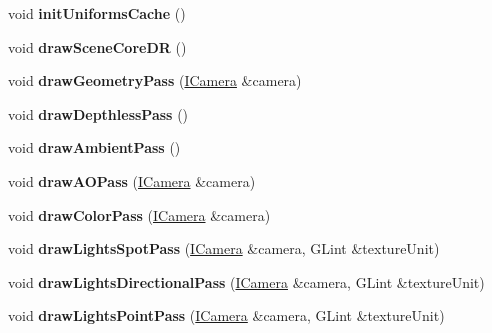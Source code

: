 \begin{DoxyCompactItemize}
void {\bfseries init\+Uniforms\+Cache} ()
\item 
\mbox{\label{classflw_1_1flf_1_1RendererDR_aef4f2d788450a34f1df7e037c418c840}} 
void {\bfseries draw\+Scene\+Core\+DR} ()
\item 
\mbox{\label{classflw_1_1flf_1_1RendererDR_ac64ac1f3331fe2a531bbe375e81d77a6}} 
void {\bfseries draw\+Geometry\+Pass} (\hyperlink{classflw_1_1flf_1_1ICamera}{I\+Camera} \&camera)
\item 
\mbox{\label{classflw_1_1flf_1_1RendererDR_a37a822463882acbbac59e9052b08a742}} 
void {\bfseries draw\+Depthless\+Pass} ()
\item 
\mbox{\label{classflw_1_1flf_1_1RendererDR_a46b49427c7d1a42c55e64b70e16d4d4d}} 
void {\bfseries draw\+Ambient\+Pass} ()
\item 
\mbox{\label{classflw_1_1flf_1_1RendererDR_a99d0d74fffca7965d9e264dd89fd0cf7}} 
void {\bfseries draw\+A\+O\+Pass} (\hyperlink{classflw_1_1flf_1_1ICamera}{I\+Camera} \&camera)
\item 
\mbox{\label{classflw_1_1flf_1_1RendererDR_a1c7fb1ab235284eeb1eb87457dc3efc5}} 
void {\bfseries draw\+Color\+Pass} (\hyperlink{classflw_1_1flf_1_1ICamera}{I\+Camera} \&camera)
\item 
\mbox{\label{classflw_1_1flf_1_1RendererDR_a1535e73ea46bb22716ea72a25665a89b}} 
void {\bfseries draw\+Lights\+Spot\+Pass} (\hyperlink{classflw_1_1flf_1_1ICamera}{I\+Camera} \&camera, G\+Lint \&texture\+Unit)
\item 
\mbox{\label{classflw_1_1flf_1_1RendererDR_a2f9c1e7c6afdfa484bd3428e0fd84ad3}} 
void {\bfseries draw\+Lights\+Directional\+Pass} (\hyperlink{classflw_1_1flf_1_1ICamera}{I\+Camera} \&camera, G\+Lint \&texture\+Unit)
\item 
\mbox{\label{classflw_1_1flf_1_1RendererDR_aa37b31115289e5ff3305275e3b6933f9}} 
void {\bfseries draw\+Lights\+Point\+Pass} (\hyperlink{classflw_1_1flf_1_1ICamera}{I\+Camera} \&camera, G\+Lint \&texture\+Unit)

\end{DoxyCompactItemize}
